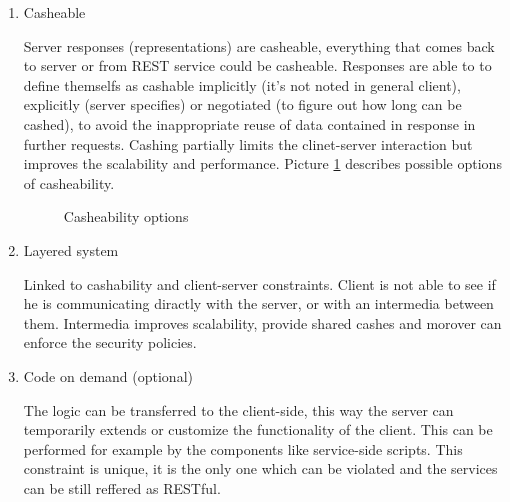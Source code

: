 \begin{description}
\begin{enumerate}
\item Casheable

Server responses (representations) are casheable, everything that comes back to server or from REST service could be casheable. Responses are able to to define themselfs as cashable implicitly (it’s not noted in general client), explicitly (server specifies) or negotiated (to figure out how long can be cashed), to avoid the inappropriate reuse of data contained in response in further requests. Cashing partially limits the clinet-server interaction but improves the scalability and performance. 
Picture \ref{fig:casheability} describes possible options of casheability.


\begin{figure}[htp] 
\caption{Casheability options}
\label{fig:casheability}
\end{figure} 

\item Layered system

Linked to cashability and client-server constraints. Client is not able to see if he is communicating diractly with the server, or with an intermedia between them. Intermedia improves scalability, provide shared cashes and morover can enforce the security policies.

\item Code on demand (optional)

The logic can be transferred to the client-side, this way the server can temporarily extends or customize the functionality of the client. This can be performed for example by the components like service-side scripts.
This constraint is unique, it is the only one which can be violated and the services can be still reffered as RESTful.

\end{enumerate}
\end{description}

